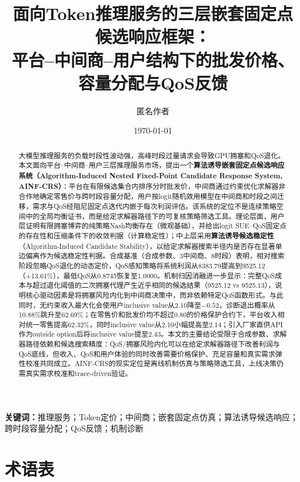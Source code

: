 \documentclass[UTF8,11pt]{ctexart}
\title{\textbf{面向Token推理服务的三层嵌套固定点候选响应框架：\\
平台--中间商--用户结构下的批发价格、容量分配与QoS反馈}}
\author{匿名作者}
\date{\today}
\begin{document}
\maketitle

\begin{abstract}
大模型推理服务的负载时段性波动强，高峰时段过量请求会导致GPU拥塞和QoS退化。本文面向平台--中间商--用户三层推理服务市场，提出一个\textbf{算法诱导嵌套固定点候选响应系统（Algorithm-Induced Nested Fixed-Point Candidate Response System, AINF-CRS）}：平台在有限候选集合内排序分时批发价，中间商通过约束优化求解器非合作地确定零售价与跨时段容量分配，用户按logit随机效用模型在中间商和时段之间迁移，需求与QoS经阻尼固定点迭代内嵌于每次利润评估。该系统的定位不是连续策略空间中的全局均衡证书，而是给定求解器路径下的可复核策略筛选工具。理论层面，用户层证明有限拥塞博弈的纯策略Nash均衡存在（微观基础），并给出logit SUE--QoS固定点的存在性和压缩条件下的收敛判据（计算稳定性）；中上层采用\textbf{算法诱导候选稳定性}（Algorithm-Induced Candidate Stability），以给定求解器搜索半径内是否存在显著单边偏离作为候选稳定性判据。合成基准（合成参数、3中间商、8时段）表明，相对搜索阶段忽略QoS退化的动态定价，QoS感知策略将系统利润从8383.79提高到9525.12（+13.61\%），最低QoS从0.8745恢复至1.0000。机制归因消融进一步显示：完整QoS成本与超过退化阈值的二次拥塞代理产生近乎相同的候选结果（9525.12 vs 9525.13），说明核心驱动因素是将拥塞风险内化到中间商决策中，而非依赖特定QoS函数形式。与此同时，无约束收入最大化会使用户inclusive value从2.10降至$-0.52$，诊断退出概率从10.88\%跳升至62.69\%；在零售价和批发价均不超过0.80的价格保护合约下，平台收入相对统一零售提高62.32\%，同时inclusive value从2.10小幅提高至2.14；引入厂家直供API作为outside option后将inclusive value提至2.43。本文的主要结论受限于合成参数、求解器路径依赖和候选搜索精度：QoS/拥塞风险内化可以在给定求解器路径下改善利润与QoS底线，但收入、QoS和用户体验的同时改善需要价格保护、充足容量和真实需求弹性校准共同成立。AINF-CRS的现实定位是离线机制仿真与策略筛选工具，上线决策仍需真实需求校准和trace-driven验证。
\end{abstract}

\noindent\textbf{关键词：}推理服务；Token定价；中间商；嵌套固定点仿真；算法诱导候选响应；跨时段容量分配；QoS反馈；机制诊断

\section*{术语表}
\label{sec:nomenclature}
\end{document}
